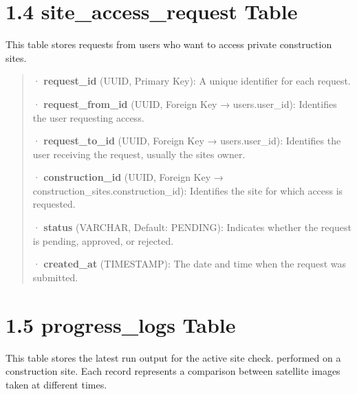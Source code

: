 \documentclass[12pt,a4paper]{report}
\begin{document}
\section{1.4 site\_access\_request
Table}\label{site_access_request-table}

This table stores requests from users who want to access private
construction sites.

\begin{quote}
· \textbf{request\_id} (UUID, Primary Key): A unique identifier for each
request.

· \textbf{request\_from\_id} (UUID, Foreign Key → users.user\_id):
Identifies the user requesting access.

· \textbf{request\_to\_id} (UUID, Foreign Key → users.user\_id):
Identifies the user receiving the request, usually the
site\textquotesingle s owner.

· \textbf{construction\_id} (UUID, Foreign Key →
construction\_sites.construction\_id): Identifies the site for which
access is requested.

· \textbf{status} (VARCHAR, Default:
\textquotesingle PENDING\textquotesingle): Indicates whether the request
is pending, approved, or rejected.

· \textbf{created\_at} (TIMESTAMP): The date and time when the request
was submitted.
\end{quote}

\section{1.5 progress\_logs Table}\label{progress_logs-table}

This table stores the latest run output for the active site check.
performed on a construction site. Each record represents a comparison
between satellite images taken at different times.
\end{document}
